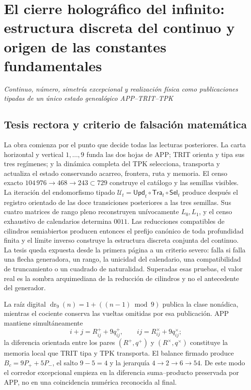 \chapter*{El cierre holográfico del infinito: estructura discreta del continuo y origen de las constantes fundamentales}

\begin{center}
\large\itshape
Continuo, número, simetría excepcional y realización física como publicaciones
tipadas de un único estado genealógico APP--TRIT--TPK
\end{center}

\section*{Tesis rectora y criterio de falsación matemática}

La obra comienza por el punto que decide todas las lecturas posteriores. La
carta horizontal y vertical \(1,\ldots,9\) funda las dos hojas de APP; TRIT
orienta y tipa sus tres regímenes; y la dinámica completa del TPK selecciona,
transporta y actualiza el estado conservando acarreo, frontera, ruta y memoria.
El censo exacto \(104\,976\to468\to243\subset729\) construye el catálogo y las
semillas visibles. La iteración del endomorfismo tipado
\(\mathcal U_t=\mathsf{Upd}_t\circ\mathsf{Tra}_t\circ\mathsf{Sel}_t\) produce
después el registro orientado de las doce transiciones posteriores a las tres
semillas. Sus cuatro matrices de rango pleno reconstruyen unívocamente
\(L_0,L_1\), y el censo exhaustivo de calendarios determina \(0011\). Las
reducciones compatibles de cilindros semiabiertos producen entonces el prefijo
canónico de toda profundidad finita y el límite inverso construye la estructura
discreta conjunta del continuo. La tesis queda expuesta desde la primera página
a un criterio severo: falla si falla una flecha generadora, un rango, la
unicidad del calendario, una compatibilidad de truncamiento o un cuadrado de
naturalidad. Superadas esas pruebas, el valor real es la sombra arquimediana de
la reducción de cilindros y no el antecedente del generador.

La raíz digital
\(\operatorname{dr}_9(n)=1+((n-1)\bmod9)\) publica la clase nonádica, mientras
el cociente conserva las vueltas omitidas por esa publicación. APP mantiene
simultáneamente
\[
 i+j=R^+_{ij}+9q^+_{ij},\qquad
 ij=R^\times_{ij}+9q^\times_{ij};
\]
la diferencia orientada entre los pares \((R^+,q^+)\) y
\((R^\times,q^\times)\) constituye la memoria local que TRIT tipa y TPK
transporta. El balance firmado produce \(B_c=9P_++5P_-\), el salto
\(9-5=4\) y la jerarquía \(4\to2\to6\to54\). De este modo el corredor
excepcional empieza en la diferencia suma--producto preservada por APP, no en
una coincidencia numérica reconocida al final.

